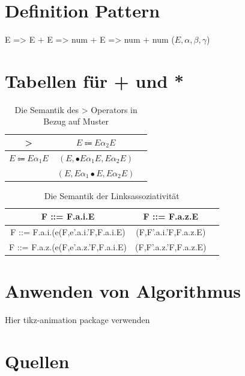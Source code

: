 \documentclass[t]{beamer}
\begin{document}
    \section{Definition Pattern}
    \begin{frame}
        E => E + E => num + E => num + num
        ($E, \alpha, \beta, \gamma$)
    \end{frame}


    \section{Tabellen für + und *}
    \begin{frame}
        \begin{table}[h]
            \centering
            \caption{Die Semantik des > Operators in Bezug auf Muster}
            \begin{tabular}{|c|c|c|}
                \hline
                > & $E \Coloneqq E\alpha_{2}E$         \\
                \hline
                $E \Coloneqq E\alpha_{1}E$ & $(E, \bullet{E}\alpha_{1}E, {E}\alpha_{2}E)$ \\& $(E, E\alpha_{1}\bullet{E}, {E}\alpha_{2}E)$ \\
                \hline
            \end{tabular}\label{tab:table}
        \end{table}

        \begin{table}[h]
            \centering
            \caption{Die Semantik der Linksassoziativität}
            \begin{tabular}{|c|c|c|}
                \hline
                F ::= F.a.i.E                       & F ::= F.a.z.E         & \\
                \hline
                F ::= F.a.i.(e(F,e'.a.i.'F,F.a.i.E) & (F,F'.a.i.'F,F.a.z.E) & \\
                \hline
                F ::= F.a.z.(e(F,e'.a.z.'F,F.a.i.E) & (F,F'.a.z.'F,F.a.z.E) & \\
                \hline
            \end{tabular}\label{tab:table2}
        \end{table}

    \end{frame}


    \section{Anwenden von Algorithmus}
    \begin{frame}
        Hier tikz-animation package verwenden
    \end{frame}


    \section{Quellen}
    \begin{frame}[allowframebreaks]
        
        
    \end{frame}
\end{document}
